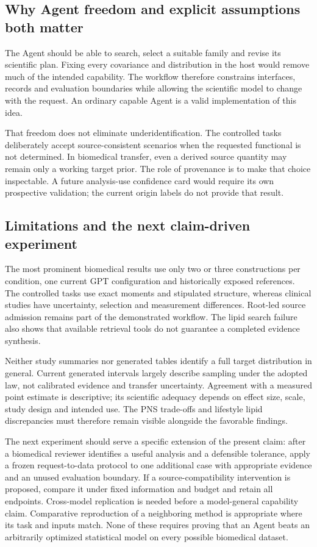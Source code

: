 \documentclass[11pt,letterpaper]{article}
\begin{document}
\subsection{Why Agent freedom and explicit assumptions both matter}

The Agent should be able to search, select a suitable family and revise its scientific plan. Fixing every covariance and distribution in the host would remove much of the intended capability. The workflow therefore constrains interfaces, records and evaluation boundaries while allowing the scientific model to change with the request. An ordinary capable Agent is a valid implementation of this idea.


That freedom does not eliminate underidentification. The controlled tasks deliberately accept source-consistent scenarios when the requested functional is not determined. In biomedical transfer, even a derived source quantity may remain only a working target prior. The role of provenance is to make that choice inspectable. A future analysis-use confidence card would require its own prospective validation; the current origin labels do not provide that result.


\subsection{Limitations and the next claim-driven experiment}

The most prominent biomedical results use only two or three constructions per condition, one current GPT configuration and historically exposed references. The controlled tasks use exact moments and stipulated structure, whereas clinical studies have uncertainty, selection and measurement differences. Root-led source admission remains part of the demonstrated workflow. The lipid search failure also shows that available retrieval tools do not guarantee a completed evidence synthesis.


Neither study summaries nor generated tables identify a full target distribution in general. Current generated intervals largely describe sampling under the adopted law, not calibrated evidence and transfer uncertainty. Agreement with a measured point estimate is descriptive; its scientific adequacy depends on effect size, scale, study design and intended use. The PNS trade-offs and lifestyle lipid discrepancies must therefore remain visible alongside the favorable findings.


The next experiment should serve a specific extension of the present claim: after a biomedical reviewer identifies a useful analysis and a defensible tolerance, apply a frozen request-to-data protocol to one additional case with appropriate evidence and an unused evaluation boundary. If a source-compatibility intervention is proposed, compare it under fixed information and budget and retain all endpoints. Cross-model replication is needed before a model-general capability claim. Comparative reproduction of a neighboring method is appropriate where its task and inputs match. None of these requires proving that an Agent beats an arbitrarily optimized statistical model on every possible biomedical dataset.
\end{document}
